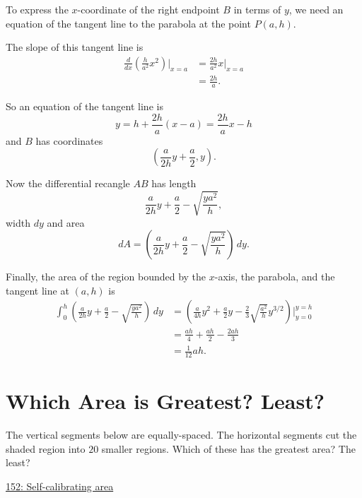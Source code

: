 \documentclass{ximera}
\begin{document}
\begin{question}
\begin{explanation}
\begin{enumerate}
To express the $x$-coordinate of the right endpoint $B$ in terms of $y$, we need an equation of the tangent line to the parabola at the point $P(a,h)$. 

The slope of this tangent line is
\begin{align*}
\frac{d}{dx} \left(   \frac{h}{a^2}x^2 \right) \Big|_{x=a}    &= \frac{2h}{a^2}x  \Big|_{x=a}  \\
                                                      &= \frac{2h}{a} .
\end{align*}

So an equation of the tangent line is
\[
 y = h +\frac{2h}{a} \left(  x - a \right) = \frac{2h}{a}x - h 
\]
and $B$ has coordinates
\[
   \left(\frac{a}{2h}y + \frac{a}{2}, y \right).
\]

Now the differential recangle $AB$ has length
\[
   \frac{a}{2h}y + \frac{a}{2} - \sqrt{\frac{ya^2}{h}} ,
\]
width $dy$ and area
\[
    dA = \left( \frac{a}{2h}y + \frac{a}{2} - \sqrt{\frac{ya^2}{h}} \right) \, dy .
\]

Finally, the area of the region bounded by the $x$-axis, the parabola, and the tangent line at $(a,h)$ is
\begin{align*}
  \int_0^h \left( \frac{a}{2h}y + \frac{a}{2} - \sqrt{\frac{ya^2}{h}} \right) \, dy &= \left(    \frac{a}{4h}y^2 + \frac{a}{2}y - \frac{2}{3} \sqrt{\frac{a^2}{h}} y^{3/2} \right)\Big|_{y=0}^{y=h} \\
                                                     &= \frac{ah}{4} + \frac{ah}{2} - \frac{2ah}{3} \\
                                                      &= \frac{1}{12} ah .
\end{align*}

\end{enumerate}
\end{explanation}

\end{question}


\section{Which Area is Greatest? Least?}

\begin{question} \label{QPlerredd}

The vertical segments below are equally-spaced. The horizontal segments cut the shaded region into $20$ smaller regions. Which of these has the greatest area? The least?

\begin{onlineOnly}
    \begin{center}
\end{center}
\end{onlineOnly}

\href{https://www.desmos.com/calculator/wsgteg55ta}{152: Self-calibrating area}
\end{question}
\end{document}
